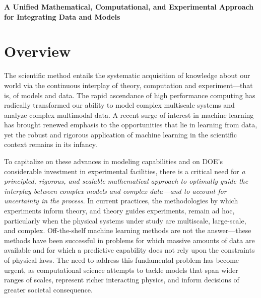 \documentclass[11pt]{article}
\begin{document}
\begin{center}
{\large \textbf{ A Unified Mathematical, Computational, and
    Experimental Approach for Integrating Data and Models}}
\end{center}
%

\section{Overview}

The scientific method entails the systematic acquisition of knowledge
about our world via the continuous interplay of theory, computation
and experiment---that is, of models and data. The rapid ascendance of
high performance computing has radically transformed our ability to
model complex multiscale systems and analyze complex multimodal
data. A recent surge of interest in machine learning has brought
renewed emphasis to the opportunities that lie in learning from data,
yet the robust and rigorous application of machine learning in the
scientific context remains in its infancy.

To capitalize on these advances in modeling capabilities and on DOE's
considerable investment in experimental facilities, there is a
critical need for {\em a principled, rigorous, and scalable
  mathematical approach to optimally guide the interplay between
  complex models and complex data---and to account for uncertainty in
  the process}.  In current practices, the methodologies by which
experiments inform theory, and theory guides experiments, remain ad
hoc, particularly when the physical systems under study are
multiscale, large-scale, and complex.  Off-the-shelf machine learning
methods are not the answer---these methods have been successful in
problems for which massive amounts of data are available and for which
a predictive capability does not rely upon the constraints of physical
laws.  The need to address this fundamental problem has become urgent,
as computational science attempts to tackle models that span wider
ranges of scales, represent richer interacting physics, and inform
decisions of greater societal consequence.
\end{document}
